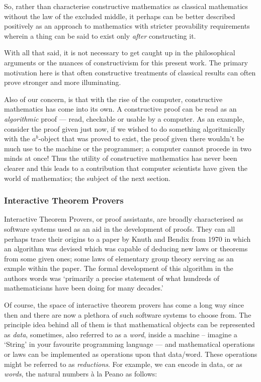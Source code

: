 \documentclass[oneside,12pt]{article}
\begin{document}
So, rather than characterise constructive mathematics as classical mathematics without the law of the excluded middle, it perhaps can be better described positively as an approach to mathematics with stricter provability requirements wherein a thing can be said to exist only \emph{after} constructing it.

With all that said, it is not necessary to get caught up in the philosophical arguments or the nuances of constructivism for this present work. The primary motivation here is that often constructive treatments of classical results can often prove stronger and more illuminating.


Also of our concern, is that with the rise of the computer, constructive mathematics has come into its own. A constructive proof can be read as an \emph{algorithmic} proof --- read, checkable or usable by a computer. As an example, consider the proof given just now, if we wished to do something algoritmically with the $a^b$-object that was proved to exist, the proof given there wouldn't be much use to the machine or the programmer; a computer cannot procede in two minds at once! Thus the utility of constructive mathematics has never been clearer and this leads to a contribution that computer scientists have given the world of mathematics; the subject of the next section.


\subsubsection{Interactive Theorem Provers}

Interactive Theorem Provers, or proof assistants, are broadly characterised as software systems used as an aid in the development of proofs. They can all perhaps trace their origins to a paper by Knuth and Bendix\cite{KNUTH1970263} from 1970 in which an algorithm was devised which was capable of deducing new laws or theorems from some given ones; some laws of elementary group theory serving as an exmple within the paper. The formal development of this algorithm in the authors words was `primarily a precise statement of what hundreds of mathematicians have been doing for many decades.'


Of course, the space of interactive theorem provers has come a long way since then and there are now a plethora of such software systems to choose from. The principle idea behind all of them is that mathematical objects can be represented as \emph{data}, sometimes, also referred to as a \emph{word}, inside a machine -- imagine a `String' in your favourite programming language --- and mathematical operations or laws can be implemented as operations upon that data/word. These operations might be referred to as \emph{reductions}. For example, we can encode in data, or as \emph{words}, the natural numbers \`{a} la Peano as follows:
\end{document}
